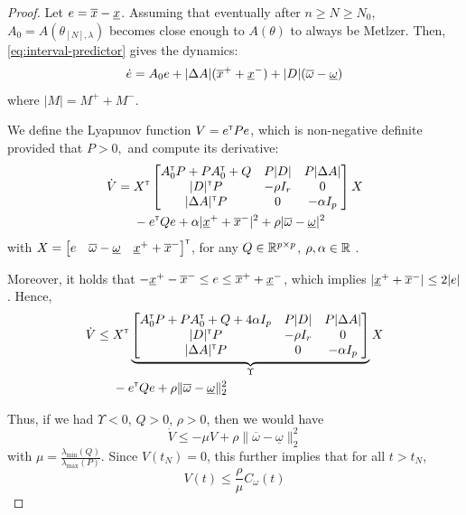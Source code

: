 \documentclass{article}
\begin{document}
\begin{proof}
Let $e = \overline{x} - \underline{x}$. Assuming that eventually after $n\geq N \geq N_0$, $A_0 = A(\theta_{[N],\lambda})$ becomes close enough to $A(\theta)$ to always be Metlzer. Then, \eqref{eq:interval-predictor} gives the dynamics:
\begin{align*}
\dot{e} = A_0e + |\Delta A|(\overline{x}^+ + \underline{x}^-) + |D|(\overline{\omega} - \underline{\omega})
\end{align*}
where $|M| = M^+ + M^-$.

We define the Lyapunov function $V = e^{\mathsf{\scriptscriptstyle T}} P e$, which is non-negative definite provided that
$
P>0,
$ and compute its derivative:
\begin{align*}
\dot{V} ={}& X^{\mathsf{\scriptscriptstyle T}}
\begin{bmatrix}
A_0^{\mathsf{\scriptscriptstyle T}} P + P A_0^{\mathsf{\scriptscriptstyle T}} + Q & P|D| & P|\Delta A| \\
|D|^{\mathsf{\scriptscriptstyle T}} P & -\rho I_r & 0\\
|\Delta A|^{\mathsf{\scriptscriptstyle T}} P & 0 & -\alpha I_p
\end{bmatrix}
X\\
& - e^{\mathsf{\scriptscriptstyle T}} Q e + \alpha |\underline{x}^+ + \overline{x}^-|^2 + \rho |\overline{\omega} - \underline{\omega}|^2
\end{align*}
with $X=\begin{bmatrix}
e & \overline{\omega} - \underline{\omega} &  \underline{x}^+ + \overline{x}^-
\end{bmatrix}^{\mathsf{\scriptscriptstyle T}}$, for any $Q\in\mathbb{R}^{p\times p}$, $\rho,\alpha\in\mathbb{R}$ . 

Moreover, it holds that $-\underline{x}^+ -\overline{x}^- \leq e \leq \overline{x}^+ + \underline{x}^-$, which implies $|\underline{x}^+ + \overline{x}^-| \leq 2 |e|$. Hence,
\begin{align*}
\dot{V} \leq {}& X^{\mathsf{\scriptscriptstyle T}}
\underbrace{\begin{bmatrix}
A_0^{\mathsf{\scriptscriptstyle T}} P + P A_0^{\mathsf{\scriptscriptstyle T}} + Q + 4\alpha I_p & P|D| & P|\Delta A| \\
|D|^{\mathsf{\scriptscriptstyle T}} P & -\rho I_r & 0\\
|\Delta A|^{\mathsf{\scriptscriptstyle T}} P & 0 & -\alpha I_p
\end{bmatrix}}_{\Upsilon}
X\\
& - e^{\mathsf{\scriptscriptstyle T}} Q e + \rho \|\overline{\omega} - \underline{\omega}\|_2^2
\end{align*}

Thus, if we had $\Upsilon < 0$, $Q>0$, $\rho > 0$, then we would have
\[
\dot{V} \leq -\mu V + \rho \|\overline{\omega} - \underline{\omega}\|_2^2
\]
with $\mu = \frac{\lambda_{\min}(Q)}{\lambda_{\max}(P)}$. Since $V(t_N) = 0$, this further implies that for all $t>t_N$, 
\begin{equation}
\label{eq:lyap-bound}
V(t) \leq \frac{\rho}{\mu} C_\omega(t)
\end{equation}


\end{proof}
\end{document}
